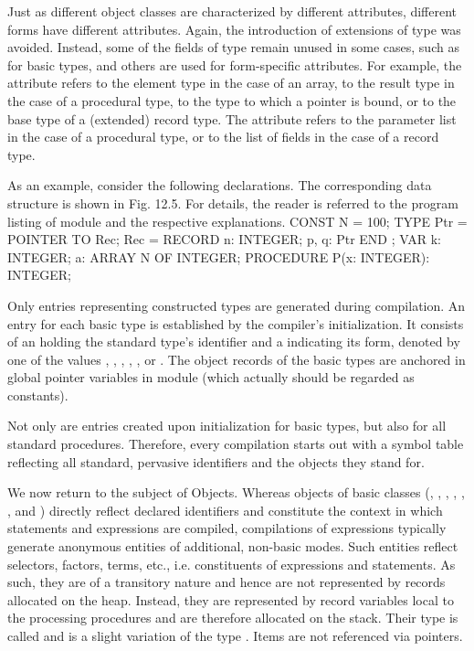 Just as different object classes are characterized by different attributes, different forms have different attributes. Again, the introduction of extensions of type  was avoided. Instead, some of the fields of type  remain unused in some cases, such as for basic types, and others are used for form-specific attributes. For example, the attribute  refers to the element type in the case of an array, to the result type in the case of a procedural type, to the type to which a pointer is bound, or to the base type of a (extended) record type. The attribute  refers to the parameter list in the case of a procedural type, or to the list of fields in the case of a record type.

As an example, consider the following declarations. The corresponding data structure is shown in Fig. 12.5. For details, the reader is referred to the program listing of module  and the respective explanations.
\begintt
CONST N = 100;
TYPE Ptr = POINTER TO Rec;
     Rec = RECORD n: INTEGER; p, q: Ptr END ;
VAR k: INTEGER;
    a: ARRAY N OF INTEGER;
PROCEDURE P(x: INTEGER): INTEGER;
\endtt


Only entries representing constructed types are generated during compilation. An entry for each basic type is established by the compiler's initialization. It consists of an  holding the standard type's identifier and a  indicating its form, denoted by one of the values , , , , , or . The object records of the basic types are anchored in global pointer variables in module  (which actually should be regarded as constants).

Not only are entries created upon initialization for basic types, but also for all standard procedures. Therefore, every compilation starts out with a symbol table reflecting all standard, pervasive identifiers and the objects they stand for.

We now return to the subject of Objects. Whereas objects of basic classes (, , , , , ,  and ) directly reflect declared identifiers and constitute the context in which statements and expressions are compiled, compilations of expressions typically generate anonymous entities of additional, non-basic modes. Such entities reflect selectors, factors, terms, etc., i.e. constituents of expressions and statements. As such, they are of a transitory nature and hence are not represented by records allocated on the heap. Instead, they are represented by record variables local to the processing procedures and are therefore allocated on the stack. Their type is called  and is a slight variation of the type . Items are not referenced via pointers.

